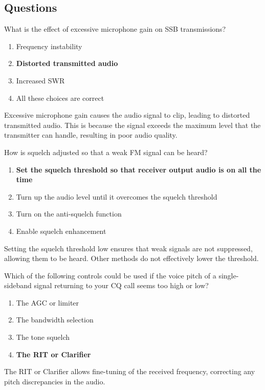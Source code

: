 \subsection*{Questions}
\begin{tcolorbox}[colback=gray!10!white,colframe=black!75!black,title={T4B01}]
    What is the effect of excessive microphone gain on SSB transmissions?
    \begin{enumerate}[label=\Alph*),noitemsep]
        \item Frequency instability
        \item \textbf{Distorted transmitted audio}
        \item Increased SWR
        \item All these choices are correct
    \end{enumerate}
\end{tcolorbox}
Excessive microphone gain causes the audio signal to clip, leading to distorted transmitted audio. This is because the signal exceeds the maximum level that the transmitter can handle, resulting in poor audio quality.


\begin{tcolorbox}[colback=gray!10!white,colframe=black!75!black,title={T4B03}]
    How is squelch adjusted so that a weak FM signal can be heard?
    \begin{enumerate}[label=\Alph*),noitemsep]
        \item \textbf{Set the squelch threshold so that receiver output audio is on all the time}
        \item Turn up the audio level until it overcomes the squelch threshold
        \item Turn on the anti-squelch function
        \item Enable squelch enhancement
    \end{enumerate}
\end{tcolorbox}
Setting the squelch threshold low ensures that weak signals are not suppressed, allowing them to be heard. Other methods do not effectively lower the threshold.


\begin{tcolorbox}[colback=gray!10!white,colframe=black!75!black,title={T4B06}]
    Which of the following controls could be used if the voice pitch of a single-sideband signal returning to your CQ call seems too high or low?
    \begin{enumerate}[label=\Alph*),noitemsep]
        \item The AGC or limiter
        \item The bandwidth selection
        \item The tone squelch
        \item \textbf{The RIT or Clarifier}
    \end{enumerate}
\end{tcolorbox}
The RIT or Clarifier allows fine-tuning of the received frequency, correcting any pitch discrepancies in the audio.

